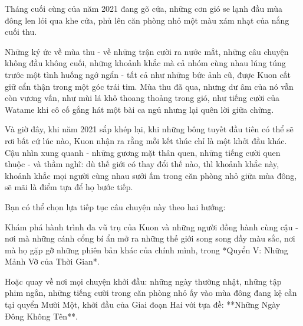 \documentclass[main.tex]{subfiles}
\begin{document}
Tháng cuối cùng của năm 2021 đang gõ cửa, những cơn gió se lạnh đầu mùa đông len lỏi qua khe cửa, phủ lên căn phòng nhỏ một màu xám nhạt của nắng cuối thu.

Những ký ức về mùa thu - về những trận cười ra nước mắt, những câu chuyện không đầu không cuối, những khoảnh khắc mà cả nhóm cùng nhau lúng túng trước một tình huống ngớ ngẩn - tất cả như những bức ảnh cũ, được Kuon cất giữ cẩn thận trong một góc trái tim. Mùa thu đã qua, nhưng dư âm của nó vẫn còn vương vấn, như mùi lá khô thoang thoảng trong gió, như tiếng cười của Watame khi cô cố gắng hát một bài ca ngủ nhưng lại quên lời giữa chừng.

Và giờ đây, khi năm 2021 sắp khép lại, khi những bông tuyết đầu tiên có thể sẽ rơi bất cứ lúc nào, Kuon nhận ra rằng mỗi kết thúc chỉ là một khởi đầu khác. Cậu nhìn xung quanh - những gương mặt thân quen, những tiếng cười quen thuộc - và thầm nghĩ: dù thế giới có thay đổi thế nào, thì khoảnh khắc này, khoảnh khắc mọi người cùng nhau sưởi ấm trong căn phòng nhỏ giữa mùa đông, sẽ mãi là điểm tựa để họ bước tiếp.

Bạn có thể chọn lựa tiếp tục câu chuyện này theo hai hướng:

Khám phá hành trình đa vũ trụ của Kuon và những người đồng hành cùng cậu - nơi mà những cánh cổng bí ẩn mở ra những thế giới song song đầy màu sắc, nơi mà họ gặp gỡ những phiên bản khác của chính mình, trong *Quyển V: Những Mảnh Vỡ của Thời Gian*.

Hoặc quay về nơi mọi chuyện khởi đầu: những ngày thường nhật, những tập phim ngắn, những tiếng cười trong căn phòng nhỏ ấy vào mùa đông đang kệ cần tại quyển Mười Một, khởi đầu của Giai đoạn Hai với tựa đề: **Những Ngày Đông Không Tên**.
\end{document}
